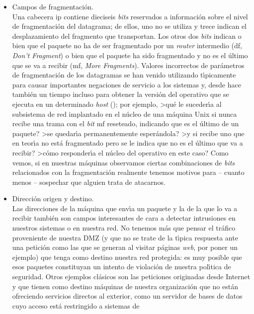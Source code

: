 \begin{itemize}
\item Campos de fragmentaci\'on.\\
Una cabecera {\sc ip} contiene dieciseis {\it bits} reservados a informaci\'on 
sobre el nivel de fragmentaci\'on del datagrama; de ellos, uno no se utiliza y 
trece indican el desplazamiento del fragmento que transportan. Los otros dos 
{\it bits} indican o bien que el paquete no ha de ser fragmentado por un {\it
router} intermedio ({\sc df}, {\it Don\'{}t Fragment}) o bien que el paquete ha 
sido fragmentado y no es el \'ultimo que se va a recibir ({\sc mf}, {\it More
Fragments}). Valores incorrectos de par\'ametros de fragmentaci\'on de los 
datagramas se han venido utilizando t\'{\i}picamente para causar importantes 
negaciones de servicio a los sistemas y, desde hace tambi\'en un tiempo incluso 
para obtener la versi\'on del operativo que se ejecuta en un determinado {\it 
host} (\cite{kn:fyo98}); por ejemplo, >qu\'e le suceder\'{\i}a al 
subsistema de red implantado en el n\'ucleo de una m\'aquina Unix si nunca 
recibe una trama con el {\it bit} {\sc mf} reseteado, indicando que es el 
\'ultimo de un paquete? >se quedar\'{\i}a permanentemente esper\'andola? >y 
si recibe uno que en teor\'{\i}a no est\'a fragmentado pero se le indica que no
es el \'ultimo que va a recibir? >c\'omo responder\'{\i}a el n\'ucleo del 
operativo en este caso? Como vemos, si en nuestras m\'aquinas observamos 
ciertas combinaciones de {\it bits} relacionados con la fragmentaci\'on 
realmente tenemos motivos para -- cuanto menos -- sospechar que alguien trata 
de atacarnos.
\item Direcci\'on origen y destino.\\
Las direcciones de la m\'aquina que env\'{\i}a un paquete y la de la que lo va
a recibir tambi\'en son campos interesantes de cara a detectar intrusiones en
nuestros sistemas o en nuestra red. No tenemos m\'as que pensar el tr\'afico 
proveniente de nuestra DMZ (y que no se trate de la t\'{\i}pica respuesta ante 
una petici\'on como las que se generan al visitar p\'aginas {\it web}, por 
poner un ejemplo) que tenga como destino nuestra red protegida: es muy posible 
que esos paquetes constituyan un intento de violaci\'on de nuestra 
pol\'{\i}tica de seguridad. Otros ejemplos cl\'asicos son las peticiones 
originadas desde Internet y que tienen como destino m\'aquinas de nuestra 
organizaci\'on que no est\'an ofreciendo servicios directos al exterior, como 
un servidor de bases de datos cuyo acceso est\'a restringido a sistemas de 

\end{itemize}
